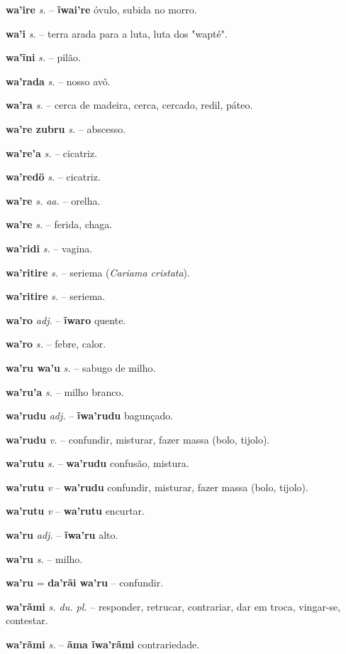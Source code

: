 \textbf{wa'ire} \textit{s.} -- \textbf{ĩwai're} óvulo, subida no morro.

\textbf{wa'i} \textit{s.} -- terra arada para a luta, luta dos "wapté".

\textbf{wa'ĩni} \textit{s.} -- pilão.

\textbf{wa'rada} \textit{s.} -- nosso avô.

\textbf{wa'ra} \textit{s.} -- cerca de madeira, cerca, cercado, redil, páteo.

\textbf{wa're zubru} \textit{s.} -- abscesso.

\textbf{wa're'a} \textit{s.} -- cicatriz.

\textbf{wa'redö} \textit{s.} -- cicatriz.

\textbf{wa're} \textit{s. aa.} -- orelha.

\textbf{wa're} \textit{s.} -- ferida, chaga.

\textbf{wa'ridi} \textit{s.} -- vagina.

\textbf{wa'ritire} \textit{s.} -- seriema (\textit{Cariama cristata}).

\textbf{wa'ritire} \textit{s.} -- seriema.

\textbf{wa'ro} \textit{adj.} -- \textbf{ĩwaro} quente.

\textbf{wa'ro} \textit{s.} -- febre, calor.

\textbf{wa'ru wa'u} \textit{s.} -- sabugo de milho.

\textbf{wa'ru'a} \textit{s.} -- milho branco.

\textbf{wa'rudu} \textit{adj.} -- \textbf{ĩwa'rudu} bagunçado.

\textbf{wa'rudu} \textit{v.} -- confundir, misturar, fazer massa (bolo, tijolo).

\textbf{wa'rutu} \textit{s.} -- \textbf{wa'rudu} confusão, mistura.

\textbf{wa'rutu} \textit{v} -- \textbf{wa'rudu} confundir, misturar, fazer massa (bolo, tijolo).

\textbf{wa'rutu} \textit{v} -- \textbf{wa'rutu} encurtar.

\textbf{wa'ru} \textit{adj.} -- \textbf{ĩwa'ru} alto.

\textbf{wa'ru} \textit{s.} -- milho.

\textbf{wa'ru} \textit{} = \textbf{da'rãi wa'ru} -- confundir.

\textbf{wa'rãmi} \textit{s. du. pl.} -- responder, retrucar, contrariar, dar em troca, vingar-se, contestar.

\textbf{wa'rãmi} \textit{s.} -- \textbf{ãma ĩwa'rãmi} contrariedade.

